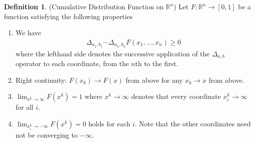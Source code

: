 \documentclass[12pt]{article}
\theoremstyle{plain}
\theoremstyle{definition}
\newtheorem{defn}[thm]{Definition}
\theoremstyle{remark}
\newcommand{\ra}{\rightarrow}
\newcommand{\R}{\mathbb{R}}
\newcommand{\Rn}{\mathbb{R}^n}
\begin{document}
\begin{defn}(Cumulative Distribution Function on $\R^n$)
\label{defn:F}
Let $F:\Rn\ra[0,1]$ be a function satisfying the following properties
\begin{enumerate}
  \item
    We have
    \begin{align}
      \Delta_{a_1,b_1} \cdots
      \Delta_{a_n,b_n}
      F(x_1,\ldots,x_n) \geq 0
      \label{deltas}
    \end{align}
    where the lefthand side denotes the successive application of the
    $\Delta_{a,b}$ operator to each coordinate, from the $n$th to the
    first.

  \item Right continuity: $F(x_k) \ra F(x)$ from above for any
    $x_k \ra x$ from above.

  \item $\lim_{x^k \ra \infty} F(x^k)=1$ where $x^k\ra \infty$ denotes
    that every coordinate $x^k_i \ra \infty$ for all $i$.

  \item $\lim_{x^k_i\ra-\infty} F(x^k) = 0$ holds for each $i$. Note
    that the other coordinates need not be converging to $-\infty$.
\end{enumerate}
\end{defn}
\end{document}

